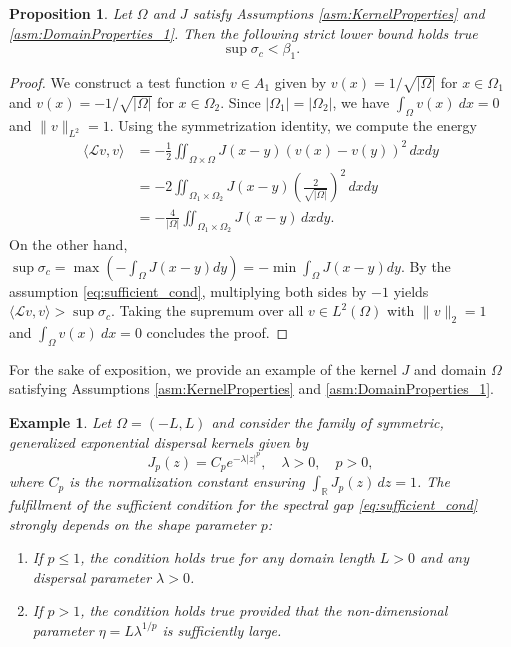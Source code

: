 \documentclass[11pt, a4paper]{article}
\theoremstyle{break}
\theoremstyle{break}
\newtheorem{prp}{Proposition}[section]
\theoremstyle{break}
\theoremstyle{break}
\theoremstyle{break}
\theoremstyle{break}
\theoremstyle{break}
\theoremstyle{break}
\theoremstyle{break}
\newtheorem{example}{Example}[section]
\begin{document}
\begin{prp}
    \label{prop:spectral_gap}
    Let $\Omega$ and $J$ satisfy Assumptions \ref{asm:KernelProperties} and \ref{asm:DomainProperties_1}.
    Then the following strict lower bound holds true
    \begin{equation*}
        \sup \sigma_c < \beta_1.
    \end{equation*}
\end{prp}
\begin{proof}
    We construct a test function $v \in A_1$ given by $v(x) = 1/\sqrt{|\Omega|}$ for $x \in \Omega_1$ and $v(x) = -1/\sqrt{|\Omega|}$ for $x \in \Omega_2$. Since $|\Omega_1|=|\Omega_2|$, we have $\int_\Omega v(x)\:dx = 0$ and $\|v\|_{L^2}=1$. Using the symmetrization identity, we compute the energy
    \begin{align*}
        \langle \mathcal{L}v, v \rangle &= -\frac{1}{2} \iint_{\Omega \times \Omega} J(x-y)(v(x)-v(y))^2 \, dx dy \\
        &= -2 \iint_{\Omega_1 \times \Omega_2} J(x-y) \left( \frac{2}{\sqrt{|\Omega|}} \right)^2 \, dx dy \\
        &= -\frac{4}{|\Omega|} \iint_{\Omega_1 \times \Omega_2} J(x-y) \, dx dy.
    \end{align*}
    On the other hand, $\sup \sigma_c = \max (-\int_\Omega J(x-y)dy) = - \min \int_\Omega J(x-y)dy$. 
    By the assumption \eqref{eq:sufficient_cond}, multiplying both sides by $-1$ yields $\langle \mathcal{L}v, v \rangle > \sup \sigma_c$. Taking the supremum over all $v \in L^2(\Omega)$ with $\|v\|_2 = 1$ and $\int_\Omega v(x)\:dx = 0$ concludes the proof.
\end{proof}

For the sake of exposition, we provide an example of the kernel $J$ and domain $\Omega$ satisfying Assumptions \ref{asm:KernelProperties} and \ref{asm:DomainProperties_1}.
\begin{example}
    \label{ex:generalized_exponential}
    Let $\Omega = (-L, L)$ and consider the family of symmetric, generalized exponential dispersal kernels given by
    \begin{equation}
        J_p(z) = C_p e^{-\lambda |z|^p}, \quad \lambda > 0, \quad p > 0,
    \end{equation}
    where $C_p$ is the normalization constant ensuring $\int_{\mathbb{R}} J_p(z) \, dz = 1$. The fulfillment of the sufficient condition for the spectral gap \eqref{eq:sufficient_cond} strongly depends on the shape parameter $p$:
    \begin{enumerate}
        \item If $p \le 1$, the condition holds true for any domain length $L > 0$ and any dispersal parameter $\lambda > 0$.
        \item If $p > 1$, the condition holds true provided that the non-dimensional parameter $\eta = L\lambda^{1/p}$ is sufficiently large.
    \end{enumerate}
\end{example}
\end{document}

